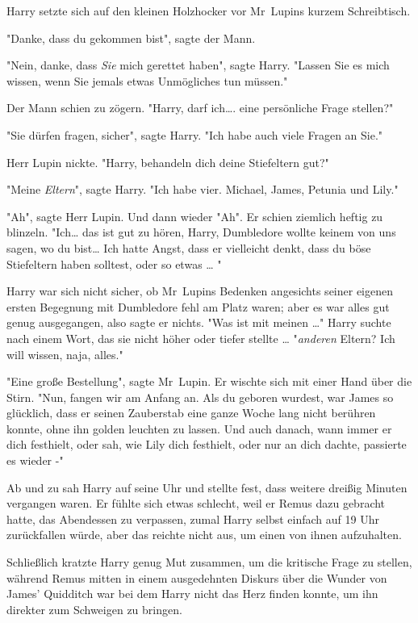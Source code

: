 {Harry setzte sich auf den kleinen Holzhocker vor Mr~Lupins kurzem Schreibtisch.

"Danke, dass du gekommen bist", sagte der Mann.

"Nein, danke, dass \emph{Sie} mich gerettet haben", sagte Harry. "Lassen Sie es mich wissen, wenn Sie jemals etwas Unmögliches tun müssen."

Der Mann schien zu zögern. "Harry, darf ich…. eine persönliche Frage stellen?"

"Sie dürfen fragen, sicher", sagte Harry. "Ich habe auch viele Fragen an Sie."

Herr Lupin nickte. "Harry, behandeln dich deine Stiefeltern gut?"

"Meine \emph{Eltern}", sagte Harry. "Ich habe vier. Michael, James, Petunia und Lily."

"Ah", sagte Herr Lupin. Und dann wieder "Ah". Er schien ziemlich heftig zu blinzeln. "Ich… das ist gut zu hören, Harry, Dumbledore wollte keinem von uns sagen, wo du bist… Ich hatte Angst, dass er vielleicht denkt, dass du böse Stiefeltern haben solltest, oder so etwas … "

Harry war sich nicht sicher, ob Mr~Lupins Bedenken angesichts seiner eigenen ersten Begegnung mit Dumbledore fehl am Platz waren; aber es war alles gut genug ausgegangen, also sagte er nichts. "Was ist mit meinen …" Harry suchte nach einem Wort, das sie nicht höher oder tiefer stellte … "\emph{anderen} Eltern? Ich will wissen, naja, alles."

"Eine große Bestellung", sagte Mr~Lupin. Er wischte sich mit einer Hand über die Stirn. "Nun, fangen wir am Anfang an. Als du geboren wurdest, war James so glücklich, dass er seinen Zauberstab eine ganze Woche lang nicht berühren konnte, ohne ihn golden leuchten zu lassen. Und auch danach, wann immer er dich festhielt, oder sah, wie Lily dich festhielt, oder nur an dich dachte, passierte es wieder -"

Ab und zu sah Harry auf seine Uhr und stellte fest, dass weitere dreißig Minuten vergangen waren. Er fühlte sich etwas schlecht, weil er Remus dazu gebracht hatte, das Abendessen zu verpassen, zumal Harry selbst einfach auf 19 Uhr zurückfallen würde, aber das reichte nicht aus, um einen von ihnen aufzuhalten.

Schließlich kratzte Harry genug Mut zusammen, um die kritische Frage zu stellen, während Remus mitten in einem ausgedehnten Diskurs über die Wunder von James' Quidditch war bei dem Harry nicht das Herz finden konnte, um ihn direkter zum Schweigen zu bringen.

}
